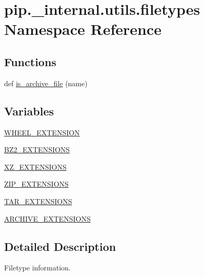 \hypertarget{namespacepip_1_1__internal_1_1utils_1_1filetypes}{}\section{pip.\+\_\+internal.\+utils.\+filetypes Namespace Reference}
\label{namespacepip_1_1__internal_1_1utils_1_1filetypes}
\subsection*{Functions}
\begin{DoxyCompactItemize}
\item 
def \hyperlink{namespacepip_1_1__internal_1_1utils_1_1filetypes_a3bf13462a0cb065400b5688edc5474a3}{is\+\_\+archive\+\_\+file} (name)
\end{DoxyCompactItemize}
\subsection*{Variables}
\begin{DoxyCompactItemize}
\item 
\hyperlink{namespacepip_1_1__internal_1_1utils_1_1filetypes_a604a029a7659cf52c4a187deeef3586b}{W\+H\+E\+E\+L\+\_\+\+E\+X\+T\+E\+N\+S\+I\+ON}
\item 
\hyperlink{namespacepip_1_1__internal_1_1utils_1_1filetypes_ab191ddac36cf5782b58a22cf6dd7a124}{B\+Z2\+\_\+\+E\+X\+T\+E\+N\+S\+I\+O\+NS}
\item 
\hyperlink{namespacepip_1_1__internal_1_1utils_1_1filetypes_a17b6e1520964c09f148bc9577634a827}{X\+Z\+\_\+\+E\+X\+T\+E\+N\+S\+I\+O\+NS}
\item 
\hyperlink{namespacepip_1_1__internal_1_1utils_1_1filetypes_ad7dccd02a42e076e9bc1333a785e882a}{Z\+I\+P\+\_\+\+E\+X\+T\+E\+N\+S\+I\+O\+NS}
\item 
\hyperlink{namespacepip_1_1__internal_1_1utils_1_1filetypes_a30b29e7adc15953e40a25ee1bed0bd2a}{T\+A\+R\+\_\+\+E\+X\+T\+E\+N\+S\+I\+O\+NS}
\item 
\hyperlink{namespacepip_1_1__internal_1_1utils_1_1filetypes_a407b95c43e4323437bc91a689530aed0}{A\+R\+C\+H\+I\+V\+E\+\_\+\+E\+X\+T\+E\+N\+S\+I\+O\+NS}
\end{DoxyCompactItemize}


\subsection{Detailed Description}
\begin{DoxyVerb}Filetype information.
\end{DoxyVerb}
 

